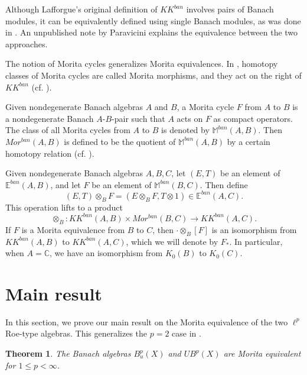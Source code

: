 \documentclass[a4,11pt]{amsart}
\newtheorem{thm}{Theorem}[section]
\theoremstyle{remark}
\begin{document}
Although Lafforgue's original definition of $KK^{ban}$ involves pairs of Banach modules, it can be equivalently defined using single Banach modules, as was done in \cite{Laf02a}. An unpublished note \cite{Par} by Paravicini explains the equivalence between the two approaches. 

The notion of Morita cycles generalizes Morita equivalences. In \cite[Section 5.3]{Par09}, homotopy classes of Morita cycles are called Morita morphisms, and they act on the right of $KK^{ban}$ (cf. \cite[Section 5.7]{Par09}).

Given nondegenerate Banach algebras $A$ and $B$, a Morita cycle $F$ from $A$ to $B$ is a nondegenerate Banach $A$-$B$-pair such that $A$ acts on $F$ as compact operators.
The class of all Morita cycles from $A$ to $B$ is denoted by $\mathbb{M}^{ban}(A,B)$.
Then $Mor^{ban}(A,B)$ is defined to be the quotient of $\mathbb{M}^{ban}(A,B)$ by a certain homotopy relation (cf. \cite[Definition 5.8]{Par09}).

Given nondegenerate Banach algebras $A,B,C$, let $(E,T)$ be an element of $\mathbb{E}^{ban}(A,B)$, and let $F$ be an element of $\mathbb{M}^{ban}(B,C)$.
Then define \[ (E,T)\otimes_B F=(E\otimes_B F,T\otimes 1)\in\mathbb{E}^{ban}(A,C).\]
This operation lifts to a product \[ \otimes_B:KK^{ban}(A,B)\times Mor^{ban}(B,C)\rightarrow KK^{ban}(A,C).\]
If $F$ is a Morita equivalence from $B$ to $C$, then $\cdot\otimes_B[F]$ is an isomorphism from $KK^{ban}(A,B)$ to $KK^{ban}(A,C)$, which we will denote by $F_*$.
In particular, when $A=\mathbb{C}$, we have an isomorphism from $K_0(B)$ to $K_0(C)$.


\section{Main result} \label{sect:main}

In this section, we prove our main result on the Morita equivalence of the two $\ell^p$ Roe-type algebras. This generalizes the $p=2$ case in \cite[Proposition 4.7]{SW13}.

\begin{thm} \label{thm:equivalence}
The Banach algebras $B^p_u(X)$ and $UB^p(X)$ are Morita equivalent for $1\leq p<\infty$.
\end{thm} 
\end{document}

